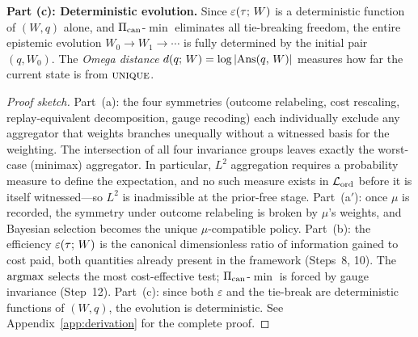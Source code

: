 \begin{theorem}
\medskip\noindent
\textbf{Part (c): Deterministic evolution.}
Since $\varepsilon(\tau;\, W)$ is a deterministic function of $(W, q)$ alone,
and $\Pi_{\mathrm{can}}$-$\min$ eliminates all tie-breaking freedom, the entire
epistemic evolution $W_0 \to W_1 \to \cdots$ is fully determined by the
initial pair $(q, W_0)$.  The \emph{Omega distance}
$d(q;\, W) = \log|\mathrm{Ans}(q,\, W)|$ measures how far the current
state is from $\textsc{unique}$.

\begin{proof}[Proof sketch]
Part~(a): the four symmetries (outcome relabeling, cost rescaling,
replay-equivalent decomposition, gauge recoding) each individually exclude
any aggregator that weights branches unequally without a witnessed basis for
the weighting.  The intersection of all four invariance groups leaves exactly
the worst-case (minimax) aggregator.  In particular, $L^2$ aggregation
requires a probability measure to define the expectation, and no such measure
exists in $\mathcal{L}_{\mathrm{ord}}$ before it is itself witnessed---so $L^2$ is
inadmissible at the prior-free stage.
Part~(a$'$): once $\mu$ is recorded, the symmetry under outcome relabeling
is broken by $\mu$'s weights, and Bayesian selection becomes the unique
$\mu$-compatible policy.
Part~(b): the efficiency $\varepsilon(\tau;\, W)$ is the canonical dimensionless ratio
of information gained to cost paid, both quantities already present in the
framework (Steps~8, 10).  The $\argmax$ selects the most cost-effective
test; $\Pi_{\mathrm{can}}$-$\min$ is forced by gauge invariance (Step~12).
Part~(c): since both $\varepsilon$ and the tie-break are deterministic
functions of $(W, q)$, the evolution is deterministic.
See Appendix~\ref{app:derivation} for the complete proof.
\end{proof}
\end{theorem}

